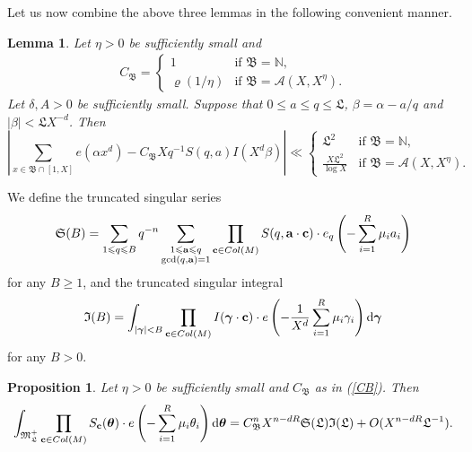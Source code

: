 \documentclass[reqno, 12pt, reqno]{amsart}
\numberwithin{equation}{section}
\newtheorem{lemma}[theorem]{Lemma}
\newtheorem{proposition}[theorem]{Proposition}
\newcommand{\NN}{\mathbb{N}}
\renewcommand{\leq}{\leqslant}
\renewcommand{\geq}{\geqslant}
\renewcommand{\c}{\mathbf{c}}
\renewcommand{\a}{\mathbf{a}}
\newcommand{\btheta}{\boldsymbol{\theta}}
\newcommand{\bgamma}{\boldsymbol{\gamma}}
\renewcommand{\=}{\equiv}
\begin{document}
Let us now combine the above three lemmas in the following convenient manner.
\begin{lemma}
\label{lem33}
Let $\eta > 0$ be sufficiently small and
\begin{eqnarray}
\label{CB}
C_\mathfrak{B} = \begin{cases}
                   1 & \mbox{if } \mathfrak{B} = \NN, \\
                   \varrho(1/\eta) & \mbox{if } \mathfrak{B} = \mathcal{A}(X, X^{\eta}).
                 \end{cases}
\end{eqnarray}
Let $\delta, A > 0$ be sufficiently small.
Suppose that $0 \leq a \leq q \leq \mathfrak{L}$, $\beta = \alpha - a/q$ and $|\beta| < \mathfrak{L} X^{-d}$.
Then
$$\left \vert
\sum_{ x \in \mathfrak{B} \cap [1, X]}  e(\alpha x^d) - C_{\mathfrak{B}} X q^{-1} S(q,a) I(X^d \beta) \right \vert \ll
\begin{cases}
\mathfrak L^2 \phantom{pp}   &\mbox{if } \mathfrak B = \mathbb N,\\
\frac{X \mathfrak L^2}{\log X} &\mbox{if }\mathfrak B = \mathcal{A}(X, X^\eta).
\end{cases}
$$
\end{lemma}

We define the truncated singular series
$$
\mathfrak{S}(B)= \sum_{1 \leq q \leq B} q^{- n }  \sum_{ \substack{ 1 \leq  \a \leq  q \\ \gcd(q, \a) = 1  } } \prod_{\c \in \textnormal{Col}( M ) } S(q, \a\cdot\c) \cdot  e_q \left(  -   \sum_{i = 1}^{R} \mu_i a_i \right)
$$
for any $B \geq  1$, and the truncated  singular integral
$$
\mathfrak{I}(B) =  \int_{ |\bgamma| <  B }   \prod_{ \c \in \textnormal{Col}(M) } I(\bgamma \cdot  \c)  \cdot  e \left(   -  \frac{1}{X^d} \sum_{i = 1}^{R} \mu_i \gamma_i \right)  \mathrm{d} \bgamma
$$
for any $B > 0$.

\begin{proposition}\label{lem:major}
Let $\eta > 0$ be sufficiently small and $C_\mathfrak{B}$ as in (\ref{CB}).
Then
\[
\int_{\mathfrak{M}_\mathfrak{L} ^+} \prod_{\c \in \textnormal{Col}(M)} S_\c(\btheta) \cdot  e\left(-\sum_{i = 1}^{R}\mu_i \theta_i  \right)\mathrm{d}\btheta
=
C_\mathfrak{B}^n  X^{n - d R} \mathfrak{S}( \mathfrak L) \mathfrak{I}(\mathfrak L) + O( X^{n  - d R} \mathfrak{L}^{- 1}).
\]
\end{proposition}
\end{document}
